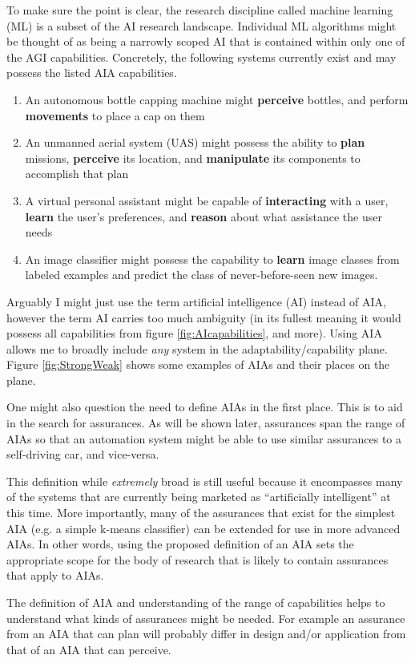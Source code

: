     To make sure the point is clear, the research discipline called machine learning (ML) is a subset of the AI research landscape. Individual ML algorithms might be thought of as being a narrowly scoped AI that is contained within only one of the AGI capabilities. Concretely, the following systems currently exist and may possess the listed AIA capabilities.

    \begin{enumerate}
         \item An autonomous bottle capping machine might \textbf{perceive} bottles, and perform \textbf{movements} to place a cap on them
         \item An unmanned aerial system (UAS) might possess the ability to \textbf{plan} missions, \textbf{perceive} its location, and \textbf{manipulate} its components to accomplish that plan
         \item A virtual personal assistant might be capable of \textbf{interacting} with a user, \textbf{learn} the user's preferences, and \textbf{reason} about what assistance the user needs
         \item An image classifier might possess the capability to \textbf{learn} image classes from labeled examples and predict the class of never-before-seen new images.
     \end{enumerate}

    Arguably I might just use the term artificial intelligence (AI) instead of AIA, however the term AI carries too much ambiguity (in its fullest meaning it would possess all capabilities from figure \ref{fig:AIcapabilities}, and more). Using AIA allows me to broadly include \emph{any} system in the adaptability/capability plane. Figure \ref{fig:StrongWeak} shows some examples of AIAs and their places on the plane.

    One might also question the need to define AIAs in the first place. This is to aid in the search for assurances. As will be shown later, assurances span the range of AIAs so that an automation system might be able to use similar assurances to a self-driving car, and vice-versa.

    This definition while \emph{extremely} broad is still useful because it encompasses many of the systems that are currently being marketed as ``artificially intelligent'' at this time. More importantly, many of the assurances that exist for the simplest AIA (e.g. a simple k-means classifier) can be extended for use in more advanced AIAs. In other words, using the proposed definition of an AIA sets the appropriate scope for the body of research that is likely to contain assurances that apply to AIAs.

    The definition of AIA and understanding of the range of capabilities helps to understand what kinds of assurances might be needed. For example an assurance from an AIA that can plan will probably differ in design and/or application from that of an AIA that can perceive.
